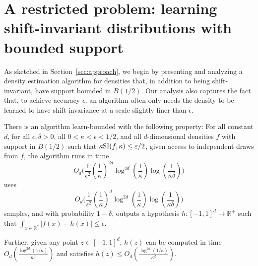 
\section{A restricted problem:  learning shift-invariant distributions with bounded support} 
\label{sec:restricted}

As sketched in Section~\ref{sec:approach}, we begin by presenting and
analyzing a density estimation algorithm for densities that, in addition
to being shift-invariant, have support bounded in $B(1/2)$.  
Our analysis also captures the fact that,
to achieve accuracy $\epsilon$, an algorithm often only
needs the density to be learned to have shift invariance at
a scale slightly finer than $\epsilon$.  

\begin{lemma} \label{lem:finite-support}
There is an algorithm \textsf{learn-bounded} with the following property:  
For all constant $d$, 
for all $\epsilon, \delta > 0$, all $0 < \kappa < \epsilon < 1/2$,
and all $d$-dimensional densities $f$ 
with support in $B(1/2)$
such that
$\kappa {\mathrm{SI}}(f, \kappa) \leq \varepsilon/2$,
given 
access to independent draws from $f$, the algorithm runs in time 
 \[
O_{d}\bigg( \frac{1}{\epsilon^2}
          \left( \frac{1}{\kappa} \right)^{2 d}
          \log^{4 d} \left( \frac{1}{\kappa} \right)
          \log \left( \frac{1}{\kappa \delta} \right) \bigg)
\]
uses 
\[
O_{d}\bigg( \frac{1}{\epsilon^2}
          \left( \frac{1}{\kappa} \right)^d
          \log^{2d} \left( \frac{1}{\kappa} \right)
          \log \left( \frac{1}{\kappa \delta} \right)\bigg) 
\]
samples, and with probability $1-\delta$, outputs a hypothesis
 $h:[-1,1]^d \rightarrow \mathbb{R}^+$ such that $\int_{x \in \mathbb{R}^d} |f(x) - h(x)| \le \epsilon$. 
 
Further, 
given any point $z \in [-1,1]^d$, $h(z)$ can be computed in time 
$
O_{d} \left( {\frac {\log^{2d}
      (1/\kappa)}{\kappa^d}} \right)$
and satisfies
$h(z) \le 
O_{d} \left( {\frac {\log^{2d} (1/\kappa)}{\kappa^d}} \right)$.
\end{lemma}

